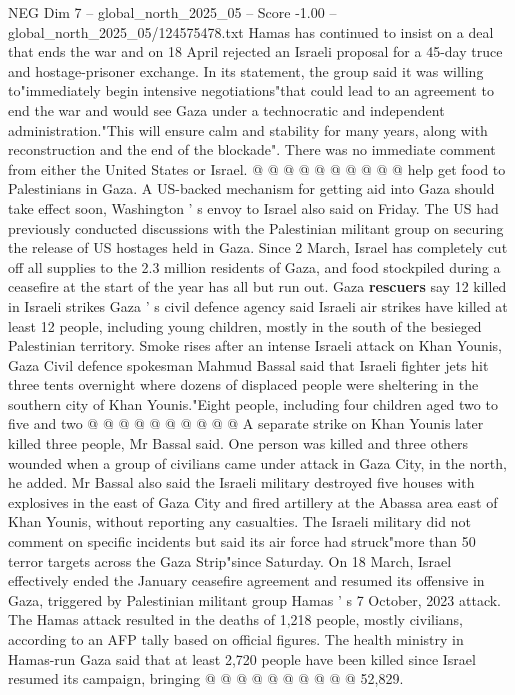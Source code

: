 \begin{textsample}{NEG Dim 7 – global\_north\_2025\_05 – Score -1.00 – global\_north\_2025\_05/124575478.txt}
Hamas has continued to insist on a deal that ends the war and on 18 April rejected an Israeli proposal for a 45-day truce and hostage-prisoner exchange.
In its statement, the group said it was willing to"immediately begin intensive negotiations"that could lead to an agreement to end the war and would see Gaza under a technocratic and independent administration."This will ensure calm and stability for many years, along with reconstruction and the end of the blockade".
There was no immediate comment from either the United States or Israel. @ @ @ @ @ @ @ @ @ @ help get food to Palestinians in Gaza.
A US-backed mechanism for getting aid into Gaza should take effect soon, Washington ' s envoy to Israel also said on Friday.
The US had previously conducted discussions with the Palestinian militant group on securing the release of US hostages held in Gaza.
Since 2 March, Israel has completely cut off all supplies to the 2.3 million residents of Gaza, and food stockpiled during a ceasefire at the start of the year has all but run out.
Gaza \textbf{rescuers} say 12 killed in Israeli strikes Gaza ' s civil defence agency said Israeli air strikes have killed at least 12 people, including young children, mostly in the south of the besieged Palestinian territory.
Smoke rises after an intense Israeli attack on Khan Younis, Gaza Civil defence spokesman Mahmud Bassal said that Israeli fighter jets hit three tents overnight where dozens of displaced people were sheltering in the southern city of Khan Younis."Eight people, including four children aged two to five and two @ @ @ @ @ @ @ @ @ @ A separate strike on Khan Younis later killed three people, Mr Bassal said.
One person was killed and three others wounded when a group of civilians came under attack in Gaza City, in the north, he added.
Mr Bassal also said the Israeli military destroyed five houses with explosives in the east of Gaza City and fired artillery at the Abassa area east of Khan Younis, without reporting any casualties.
The Israeli military did not comment on specific incidents but said its air force had struck"more than 50 terror targets across the Gaza Strip"since Saturday.
On 18 March, Israel effectively ended the January ceasefire agreement and resumed its offensive in Gaza, triggered by Palestinian militant group Hamas ' s 7 October, 2023 attack.
The Hamas attack resulted in the deaths of 1,218 people, mostly civilians, according to an AFP tally based on official figures.
The health ministry in Hamas-run Gaza said that at least 2,720 people have been killed since Israel resumed its campaign, bringing @ @ @ @ @ @ @ @ @ @ 52,829.

\end{textsample}
